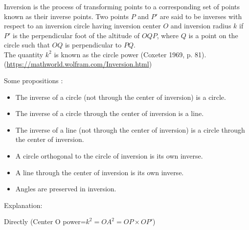 \subsubsection{}

Inversion is the process of transforming points to a corresponding set of points known as their inverse points. Two points $P$ and $P'$ are said to be inverses with respect to an inversion circle having inversion center $O$ and inversion radius $k$ if $P'$ is the perpendicular foot of the altitude of $OQP$, where  $Q$ is a point on the circle such that $OQ$ is perpendicular to $PQ$.\\
 The quantity $k^2$ is known as the circle power (Coxeter 1969, p. 81).
(\url{https://mathworld.wolfram.com/Inversion.html})

Some propositions :
\begin{itemize}
\item The inverse of a circle (not through the center of inversion) is a circle.
\item The inverse of a circle through the center of inversion is a line.
\item The inverse of a line (not through the center of inversion) is a circle through the center of inversion.
\item A circle orthogonal to the circle of inversion is its own inverse.
\item A line through the center of inversion is its own inverse.
\item Angles are preserved in inversion.
\end{itemize}

Explanation:

Directly 
(Center O power=$k^2={OA}^2=OP \times OP'$)

\begin{tkzexample}[latex=6cm,small]
\end{tkzexample} 

